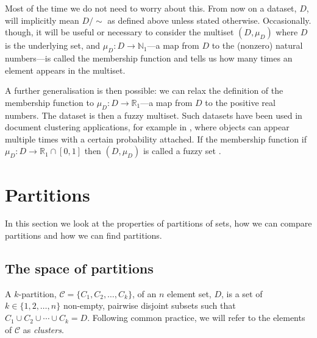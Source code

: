 \documentclass[a4paper]{report}
\newcommand{\dset}{D}
\newcommand{\clus}{\mathcal{C}}
\begin{document}
Most of the time we do not need to worry about this.  From now on a dataset,
$\dset$, will implicitly mean $\dset/\sim$ as defined above unless stated
otherwise.  Occasionally. though, it will be useful or necessary to consider
the multiset $(\dset,\mu_{\dset})$ where $\dset$ is the underlying set, and
$\mu_{\dset} \colon \dset \to \mathbb{N}_1$---a map from $\dset$ to the
(nonzero) natural numbers---is called the membership function and tells us how
many times an element appears in the multiset.

A further generalisation is then possible: we can relax the definition of the
membership function to $\mu_{\dset} \colon \dset \to \mathbb{R}_1$---a map
from $\dset$ to the positive real numbers.  The dataset is then a fuzzy
multiset.  Such datasets have been used in document clustering applications,
for example in \citep{miyamoto2003information}, where objects can appear
multiple times with a certain probability attached.  If the membership
function if $\mu_{\dset} \colon \dset \to \mathbb{R}_1 \cap [0,1]$ then
$(\dset,\mu_{\dset})$ is called a fuzzy set
\citep{zadeh1965fuzzy,gottwald2010fuzzy}.

\section{Partitions}
\label{sec:partitions}

In this section we look at the properties of partitions of sets, how we can
compare partitions and how we can find partitions.

\subsection{The space of partitions}
\label{sec:space-partitions}

A $k$-partition, $\clus = \{C_1,C_2,\dotsc,C_k\}$, of an $n$ element set,
$\dset$, is a set of $k \in \{1,2,\dotsc,n\}$ non-empty, pairwise disjoint
subsets such that $C_1 \cup C_2 \cup \dotsb \cup C_k = \dset$.  Following
common practice, we will refer to the elements of $\clus$ as
\textit{clusters}.
\end{document}
